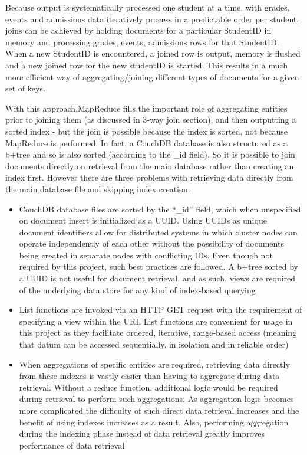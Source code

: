 

Because output is systematically processed one student at a time, with grades, events and admissions data iteratively process in a predictable order per student, joins can be achieved by holding documents for a particular StudentID in memory and processing grades, events, admissions rows for that StudentID. When a new StudentID is encountered, a joined row is output, memory is flushed and a new joined row for the new studentID is started. This results in a much more efficient way of aggregating/joining different types of documents for a given set of keys.

With this approach,MapReduce fills the important role of aggregating entities prior to joining them (as discussed in 3-way join section), and then outputting a sorted index - but the join is possible because the index is sorted, not because MapReduce is performed. In fact, a CouchDB database is also structured as a b+tree and so is also sorted (according to the \_id field). So it is possible to join documents directly on retrieval from the main database rather than creating an index first. However there are three problems with retrieving data directly from the main database file and skipping index creation:

\begin{itemize}
  \item CouchDB database files are sorted by the ``\_id'' field, which when unspecified on document insert is initialized as a UUID. Using UUIDs as unique document identifiers allow for distributed systems in which cluster nodes can operate independently of each other without the possibility of documents being created in separate nodes with conflicting IDs. Even though not required by this project, such best practices are followed. A b+tree sorted by a UUID is not useful for document retrieval, and as such, views are required of the underlying data store for any kind of index-based querying
  \item List functions are invoked via an HTTP GET request with the requirement of specifying a view within the URI. List functions are convenient for usage in this project as they facilitate ordered, iterative, range-based access (meaning that datum can be accessed sequentially, in isolation and in reliable order)
  \item When aggregations of specific entities are required, retrieving data directly from these indexes is vastly easier than having to aggregate during data retrieval. Without a reduce function, additional logic would be required during retrieval to perform such aggregations. As aggregation logic becomes more complicated the difficulty of such direct data retrieval increases and the benefit of using indexes increases as a result. Also, performing aggregation during the indexing phase instead of data retrieval greatly improves performance of data retrieval
\end{itemize}

